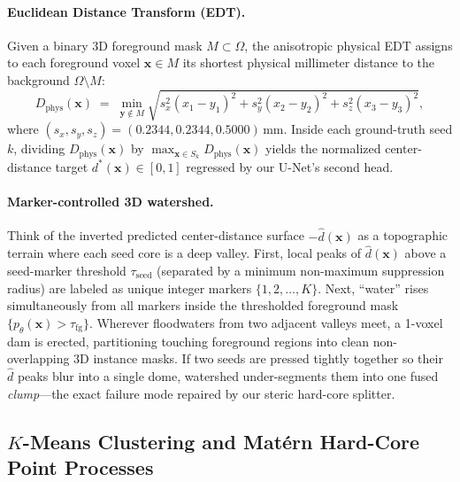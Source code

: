 \documentclass[10pt,a4paper]{article}
\renewcommand{\_}{\origunderscore\allowbreak}
\begin{document}
\paragraph{Euclidean Distance Transform (EDT).} Given a binary 3D foreground mask $M \subset \Omega$, the anisotropic physical EDT assigns to each foreground voxel $\mathbf{x} \in M$ its shortest physical millimeter distance to the background $\Omega \setminus M$:
\begin{equation}
    D_{\text{phys}}(\mathbf{x}) \;=\; \min_{\mathbf{y} \notin M} \sqrt{s_x^2(x_1 - y_1)^2 + s_y^2(x_2 - y_2)^2 + s_z^2(x_3 - y_3)^2},
\end{equation}
where $(s_x, s_y, s_z) = (0.2344, 0.2344, 0.5000)\,\text{mm}$. Inside each ground-truth seed $k$, dividing $D_{\text{phys}}(\mathbf{x})$ by $\max_{\mathbf{x}\in S_k} D_{\text{phys}}(\mathbf{x})$ yields the normalized center-distance target $d^*(\mathbf{x}) \in [0, 1]$ regressed by our U-Net's second head.

\paragraph{Marker-controlled 3D watershed.} Think of the inverted predicted center-distance surface $-\hat{d}(\mathbf{x})$ as a topographic terrain where each seed core is a deep valley. First, local peaks of $\hat{d}(\mathbf{x})$ above a seed-marker threshold $\tau_{\text{seed}}$ (separated by a minimum non-maximum suppression radius) are labeled as unique integer markers $\{1, 2, \dots, K\}$. Next, ``water'' rises simultaneously from all markers inside the thresholded foreground mask $\{p_\theta(\mathbf{x}) > \tau_{\text{fg}}\}$. Wherever floodwaters from two adjacent valleys meet, a 1-voxel dam is erected, partitioning touching foreground regions into clean non-overlapping 3D instance masks. If two seeds are pressed tightly together so their $\hat{d}$ peaks blur into a single dome, watershed under-segments them into one fused \emph{clump}---the exact failure mode repaired by our steric hard-core splitter.

\subsection{$K$-Means Clustering and Mat\'ern Hard-Core Point Processes}
\end{document}
